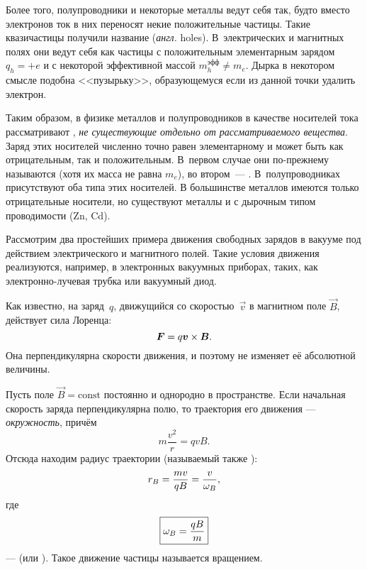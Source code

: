 Более того, полупроводники и некоторые металлы
ведут себя так, будто вместо электронов ток в них переносят некие
положительные частицы. Такие квазичастицы получили название 
(\emph{англ.} holes).
В~электрических и магнитных полях они ведут себя как частицы с положительным
элементарным зарядом $q_h=+e$ и с некоторой эффективной массой
$m_h^{эфф}\ne m_e$. Дырка в некотором смысле подобна <<пузырьку>>, образующемуся
если из данной точки удалить электрон.

Таким образом, в физике металлов и полупроводников в качестве носителей тока
рассматривают ,
\emph{не существующие отдельно от рассматриваемого вещества}.
Заряд этих носителей численно точно равен элементарному и может быть как
отрицательным, так и положительным. В~первом случае они по-прежнему называются
 (хотя их масса не равна $m_e$),
во втором~--- . В~полупроводниках присутствуют оба типа этих
носителей. В большинстве металлов имеются только отрицательные носители, но
существуют металлы и с дырочным типом проводимости (Zn, Cd).


\label{sec:freemotion}

Рассмотрим два простейших примера движения свободных зарядов в вакууме под
действием электрического и магнитного полей. Такие условия движения реализуются,
например, в электронных вакуумных приборах, таких, как электронно-лучевая
трубка или вакуумный диод.


Как известно, на заряд~$q$, движущийся со скоростью~$\vec{v}$ в магнитном поле
$\vec{B}$, действует сила Лоренца:
\begin{equation*}
    \eqmark{3.1}
    \vec{F}=q{\vec{v}}\times{\vec{B}}.
\end{equation*}
Она перпендикулярна скорости движения, и поэтому не изменяет её абсолютной величины. 

Пусть поле $\vec{B}=\mathrm{const}$ постоянно и однородно в пространстве.
Если начальная скорость заряда перпендикулярна полю, то траектория
его движения --- \emph{окружность}, причём
\[
m\frac{v^2}{r}=qvB.
\]
Отсюда находим радиус траектории (называемый также ):
\begin{equation}
    \eqmark{3.2}
    r_B =\frac{m v}{qB}= \frac{v}{\omega_B},
\end{equation}
где
\begin{equation}
    \eqmark{omega-B}
    \boxed{\omega_B=\frac{qB}{m}}
\end{equation}
---  (или ).
Такое движение частицы называется  вращением.

